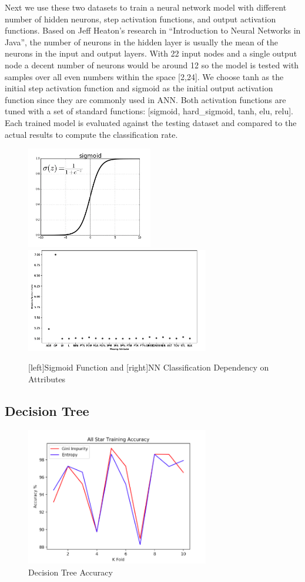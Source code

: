 \documentclass{article}
\begin{document}
Next we use these two datasets to train a neural network model with different number of hidden neurons, step activation functions, and output activation functions. Based on Jeff Heaton’s research in “Introduction to Neural Networks in Java”, the number of neurons in the hidden layer is usually the mean of the neurons in the input and output layers. With 22 input nodes and a single output node a decent number of neurons would be around 12 so the model is tested with samples over all even numbers within the space [2,24]. We choose tanh as the initial step activation function and sigmoid as the initial output activation function since they are commonly used in ANN. Both activation functions are tuned with a set of standard functions: [sigmoid, hard\_sigmoid, tanh, elu, relu]. Each trained model is evaluated against the testing dataset and compared to the actual results to compute the classification rate.


\begin{figure}
  \centering
  \includegraphics[width=5.5cm]{ann2.png}
  \includegraphics[width=8cm]{ann3.png}
  \caption{[left]Sigmoid Function and [right]NN Classification Dependency on Attributes}
\end{figure}

\subsection{Decision Tree}
\begin{figure}
  \centering
  \includegraphics[width=8cm]{decisiontree.png}
  \caption{Decision Tree Accuracy}
\end{figure}
\end{document}
